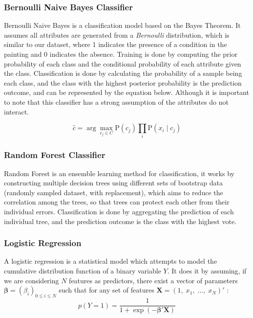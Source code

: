 \documentclass[11pt, oneside]{article}
\begin{document}
\subsubsection{Bernoulli Naive Bayes Classifier}
Bernoulli Naive Bayes is a classification model based on the Bayes Theorem. It assumes all attributes are generated from a \textit{Bernoulli} distribution, which is similar to our dataset, where 1 indicates the presence of a condition in the painting and 0 indicates the absence. Training is done by computing the prior probability of each class and the conditional probability of each attribute given the class. Classification is done by calculating the probability of a sample being each class, and the class with the highest posterior probability is the prediction outcome, and can be represented by the equation below. Although it is important to note that this classifier has a strong assumption of the attributes do not interact.

\begin{equation*}
    \hat{c} = \arg \max_{c_j\in C} \text{P}(c_j)\prod_{i}\text{P}(x_i\mid c_j)
\end{equation*}

\subsubsection{Random Forest Classifier}
Random Forest is an ensemble learning method for classification, it works by constructing multiple decision trees using different sets of bootstrap data (randomly sampled dataset, with replacement), which aims to reduce the correlation among the trees, so that trees can protect each other from their individual errors. Classification is done by aggregating the prediction of each individual tree, and the prediction outcome is the class with the highest vote.

\subsubsection{Logistic Regression}
A logistic regression is a statistical model which attempts to model the cumulative distribution function of a binary variable $Y$. It does it by assuming, if we are considering $N$ features as predictors, there exist a vector of parameters $\boldsymbol\beta = (\beta_i)_{0\leq i \leq N}$ such that for any set of features $\mathbf{X} =(1, \; x_1, \;  \ldots, \;  x_N)'$ :
\begin{equation*}
    p(Y=1) = \frac{1}{1 + \exp{\left(-\boldsymbol\beta'\mathbf{X}\right)}}
\end{equation*}
\end{document}

